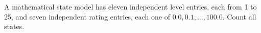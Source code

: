 A mathematical state model has eleven independent level entries, each from 1 to 25, and seven independent rating entries, each one of $0.0,0.1,\ldots,100.0$. Count all states.
